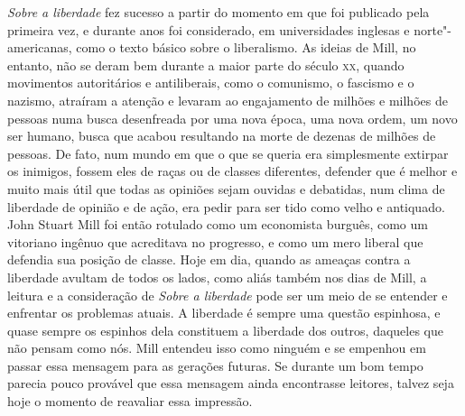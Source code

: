 \textit{Sobre a liberdade} fez sucesso a partir do momento em que foi
publicado pela primeira vez, e durante anos foi considerado, em
universidades inglesas e norte"-americanas, como o texto básico sobre
o liberalismo. As ideias de Mill, no entanto, não se deram bem durante
a maior parte do século \textsc{xx}, quando movimentos autoritários e
antiliberais, como o comunismo, o fascismo e o nazismo, atraíram a
atenção e levaram ao engajamento de milhões e milhões de pessoas numa
busca desenfreada por uma nova época, uma nova ordem, um novo ser
humano, busca que acabou resultando na morte de dezenas de milhões de
pessoas. De fato, num mundo em que o que se queria era simplesmente
extirpar os inimigos, fossem eles de raças ou de classes diferentes, 
defender que é  melhor e muito mais útil que todas as opiniões sejam
ouvidas e debatidas, num clima de liberdade de opinião e de ação, era
pedir para ser tido como velho e antiquado. John Stuart Mill foi então
rotulado como um economista burguês, como um vitoriano ingênuo que
acreditava no progresso, e como um mero liberal que defendia sua
posição de classe. Hoje em dia, quando as ameaças contra a liberdade
avultam de todos os lados, como aliás também nos dias de Mill, a
leitura e a consideração de \textit{Sobre a liberdade} pode ser um
meio de se entender e enfrentar os problemas atuais. A liberdade é
sempre uma questão espinhosa, e quase sempre os espinhos dela
constituem a liberdade dos outros, daqueles que não pensam como nós.
Mill entendeu isso como ninguém e se empenhou em passar essa mensagem
para as gerações futuras. Se durante um bom tempo parecia pouco
provável que essa mensagem ainda encontrasse leitores, talvez seja hoje
o momento de reavaliar essa impressão. 


